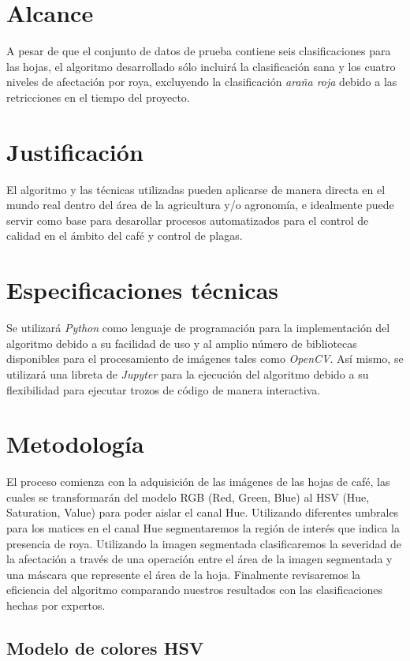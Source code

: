 \section{Alcance}
A pesar de que el conjunto de datos de prueba contiene seis clasificaciones para las hojas, el algoritmo desarrollado sólo incluirá la clasificación sana y los cuatro niveles de afectación por roya, excluyendo la clasificación \textit{araña roja} debido a las retricciones en el tiempo del proyecto.

\section{Justificación}
El algoritmo y las técnicas utilizadas pueden aplicarse de manera directa en el mundo real dentro del área de la agricultura y/o agronomía, e idealmente puede servir como base para desarollar procesos automatizados para el control de calidad en el ámbito del café y control de plagas.
 
\section{Especificaciones técnicas}
Se utilizará \textit{Python} como lenguaje de programación para la implementación del algoritmo debido a su facilidad de uso y al amplio número de bibliotecas disponibles para el procesamiento de imágenes tales como \textit{OpenCV}. Así mismo, se utilizará una libreta de \textit{Jupyter} para la ejecución del algoritmo debido a su flexibilidad para ejecutar trozos de código de manera interactiva.

\section{Metodología}
El proceso comienza con la adquisición de las imágenes de las hojas de café, las cuales se transformarán del modelo RGB (Red, Green, Blue) al HSV (Hue, Saturation, Value) para poder aislar el canal Hue. Utilizando diferentes umbrales para los matices en el canal Hue segmentaremos la región de interés que indica la presencia de roya. Utilizando la imagen segmentada clasificaremos la severidad de la afectación a través de una operación entre el área de la imagen segmentada y una máscara que represente el área de la hoja. Finalmente revisaremos la eficiencia del algoritmo comparando nuestros resultados con las clasificaciones hechas por expertos.

\subsection{Modelo de colores HSV}